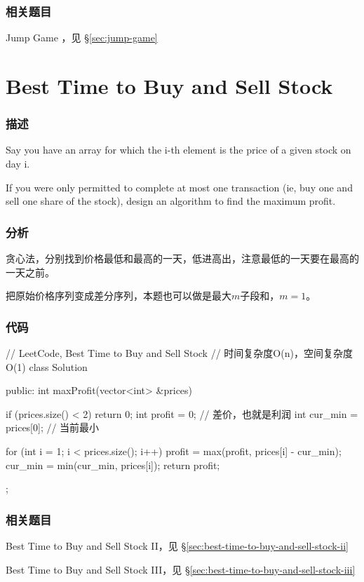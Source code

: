 \subsubsection{相关题目}
\begindot
\item Jump Game ，见 \S \ref{sec:jump-game}
\myenddot


\section{Best Time to Buy and Sell Stock} %
\label{sec:best-time-to-buy-and-sell-stock}


\subsubsection{描述}
Say you have an array for which the i-th element is the price of a given stock on day i.

If you were only permitted to complete at    most one transaction (ie, buy one and sell one share of the stock), design an algorithm to find the maximum profit.


\subsubsection{分析}
贪心法，分别找到价格最低和最高的一天，低进高出，注意最低的一天要在最高的一天之前。

把原始价格序列变成差分序列，本题也可以做是最大$m$子段和，$m=1$。

\subsubsection{代码}
\begin{Code}
// LeetCode, Best Time to Buy and Sell Stock
// 时间复杂度O(n)，空间复杂度O(1)
class Solution {
public:
    int maxProfit(vector<int> &prices) {
        if (prices.size() < 2) return 0;
        int profit = 0;  // 差价，也就是利润
        int cur_min = prices[0]; // 当前最小

        for (int i = 1; i < prices.size(); i++) {
            profit = max(profit, prices[i] - cur_min);
            cur_min = min(cur_min, prices[i]);
        }
        return profit;
    }
};
\end{Code}


\subsubsection{相关题目}
\begindot
\item Best Time to Buy and Sell Stock II，见 \S \ref{sec:best-time-to-buy-and-sell-stock-ii}
\item Best Time to Buy and Sell Stock III，见 \S \ref{sec:best-time-to-buy-and-sell-stock-iii}
\myenddot


